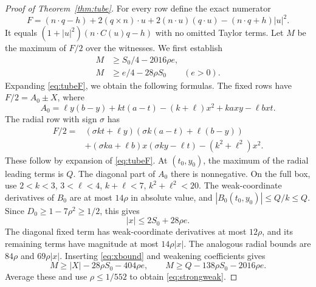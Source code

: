\documentclass[11pt]{amsart}
\theoremstyle{definition}
\theoremstyle{remark}
\begin{document}
\begin{proof}[Proof of Theorem~\ref{thm:tube}]
For every row define the exact numerator
\begin{equation}\label{eq:tubeF}
 F=(n\cdot q-h)+2(q\times n)\cdot u
       +2(n\cdot u)(q\cdot u)-(n\cdot q+h)|u|^2.
\end{equation}
It equals $(1+|u|^2)(n\cdot C(u)q-h)$ with no omitted Taylor terms.
Let $M$ be the maximum of $F/2$ over the witnesses. We first establish
\begin{align}
 M&\ge S_0/4-2016\rho e,\label{eq:strongweak}\\
 M&\ge e/4-28\rho S_0\qquad(e>0).\label{eq:excess}
\end{align}
Expanding \eqref{eq:tubeF}, we obtain the following formulas.
The fixed rows have $F/2=A_0\pm X$, where
\[
 A_0=\ell y(b-y)+kt(a-t)-(k+\ell)x^2+kaxy-\ell bxt.
\]
The radial row with sign $\sigma$ has
\begin{align*}
 F/2={}&(\sigma kt+\ell y)
             (\sigma k(a-t)+\ell(b-y))\\
       &+(\sigma ka+\ell b)x(\sigma ky-\ell t)
                         -(k^2+\ell^2)x^2.
\end{align*}
These follow by expansion of \eqref{eq:tubeF}. At $(t_0,y_0)$, the
maximum of the radial leading terms is $Q$. The diagonal part of $A_0$
there is nonnegative. On the full box, use
$2<k<3$, $3<\ell<4$, $k+\ell<7$, $k^2+\ell^2<20$.
The weak-coordinate derivatives of $B_0$ are at most $14\rho$ in
absolute value, and $|B_0(t_0,y_0)|\le Q/k\le Q$. Since
$D_0\ge1-7\rho^2\ge1/2$, this gives
\begin{equation}\label{eq:xbound}
 |x|\le2S_0+28\rho e.
\end{equation}
The diagonal fixed term has weak-coordinate derivatives at most
$12\rho$, and its remaining terms have magnitude at most
$14\rho|x|$. The analogous radial bounds are $84\rho$ and
$69\rho|x|$. Inserting \eqref{eq:xbound} and weakening coefficients gives
\[
 M\ge |X|-28\rho S_0-404\rho e,\qquad
 M\ge Q-138\rho S_0-2016\rho e.
\]
Average these and use $\rho\le1/552$ to obtain
\eqref{eq:strongweak}.


\end{proof}
\end{document}
